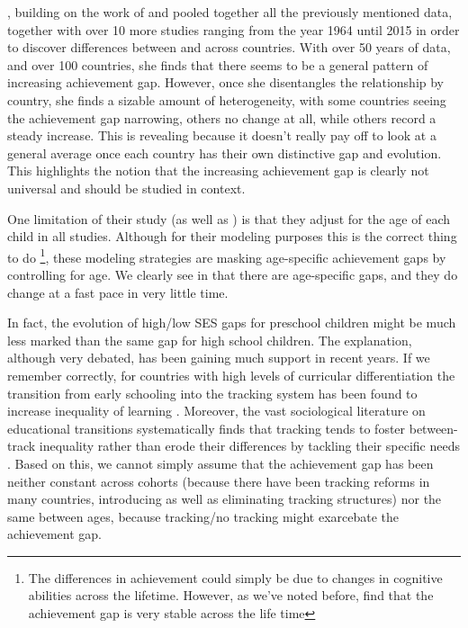 \documentclass[11pt, a4paper]{article}\usepackage[]{graphicx}\usepackage[]{color}
\begin{document}
\citet{anna2016_global}, building on the work of \citet{anna2016} and \citet{reardon_portilla} pooled together all the previously mentioned data, together with over 10 more studies ranging from the year 1964 until 2015 in order to discover differences between and across countries. With over 50 years of data, and over 100 countries, she finds that there seems to be a general pattern of increasing achievement gap. However, once she disentangles the relationship by country, she finds a sizable amount of heterogeneity, with some countries seeing the achievement gap narrowing, others no change at all, while others record a steady increase. This is revealing because it doesn't really pay off to look at a general average once each country has their own distinctive gap and evolution. This highlights the notion that the increasing achievement gap is clearly not universal and should be studied in context. 

One limitation of their study (as well as \citet{reardon2011}) is that they adjust for the age of each child in all studies. Although for their modeling purposes this is the correct thing to do \footnote{The differences in achievement could simply be due to changes in cognitive abilities across the lifetime. However, as we've noted before, \citet{bradbury2015} find that the achievement gap is very stable across the life time}, these modeling strategies are masking age-specific achievement gaps by controlling for age. We clearly see in \citet{reardon_portilla} that there are age-specific gaps, and they do change at a fast pace in very little time.

In fact, the evolution of high/low SES gaps for preschool children might be much less marked than the same gap for high school children. The explanation, although very debated, has been gaining much support in recent years. If we remember correctly, for countries with high levels of curricular differentiation the transition from early schooling into the tracking system has been found to increase inequality of learning \citep{hanushek_woesmann_tracking}. Moreover, the vast sociological literature on educational transitions systematically finds that tracking tends to foster between-track inequality rather than erode their differences by tackling their specific needs \citep{werfhorst_mijs}. Based on this, we cannot simply assume that the achievement gap has been neither constant across cohorts (because there have been tracking reforms in many countries, introducing as well as eliminating tracking structures) nor the same between ages, because tracking/no tracking might exarcebate the achievement gap.
\end{document}
